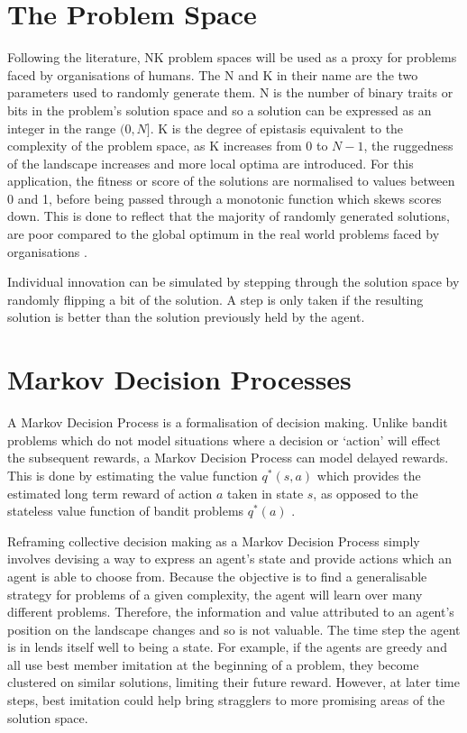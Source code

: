 \documentclass[conference]{IEEEtran}
\begin{document}
\section{The Problem Space}

Following the literature, NK problem spaces will be used
as a proxy for problems faced by organisations of humans.
The N and K in their name are the two parameters
used to randomly generate them.
N is the number of binary traits or bits in the problem's solution space
and so a solution can be expressed as an integer in the range $(0, N]$.
K is the degree of epistasis equivalent to the complexity of the problem space,
as K increases from $0$ to $N-1$,
the ruggedness of the landscape increases and more local optima are introduced.
For this application,
the fitness or score of the solutions are normalised to values between 0 and 1,
before being passed through a monotonic function
which skews scores down.
This is done to reflect that the majority of randomly generated solutions,
are poor compared to the global optimum
in the real world problems faced by organisations \cite{monotonic}.

Individual innovation can be simulated by stepping through the solution space
by randomly flipping a bit of the solution.
A step is only taken if the resulting solution is better
than the solution previously held by the agent.


\section{Markov Decision Processes}\label{mdp}

A Markov Decision Process is a formalisation of decision making.
Unlike bandit problems which do not model situations where a decision
or `action' will effect the subsequent rewards,
a Markov Decision Process can model delayed rewards.
This is done by estimating the value function $q^{*}(s, a)$
which provides the estimated long term reward of action $a$ taken in state $s$,
as opposed to the stateless value function of bandit problems $q^{*}(a)$
\cite{RLbook2020}.

Reframing collective decision making as a Markov Decision Process
simply involves devising a way to express an agent's state
and provide actions which an agent is able to choose from.
Because the objective is to find a generalisable strategy
for problems of a given complexity,
the agent will learn over many different problems.
Therefore, the information and value
attributed to an agent's position on the landscape changes
and so is not valuable.
The time step the agent is in lends itself well to being a state.
For example, if the agents are greedy and all use best member imitation
at the beginning of a problem, they become clustered on similar solutions,
limiting their future reward.
However, at later time steps, best imitation could help bring stragglers
to more promising areas of the solution space.
\end{document}
